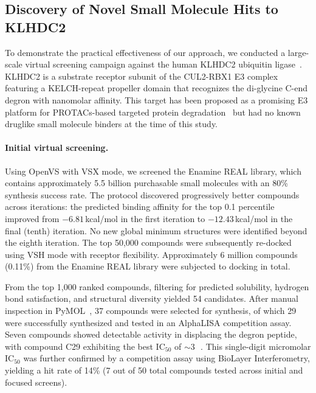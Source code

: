\documentclass[11pt]{article}
\begin{document}
\subsection{Discovery of Novel Small Molecule Hits to KLHDC2}

To demonstrate the practical effectiveness of our approach, we conducted a large-scale virtual screening campaign against the human KLHDC2 ubiquitin ligase~\citep{klhdc2_structure2019,koren2018degron}. KLHDC2 is a substrate receptor subunit of the CUL2-RBX1 E3 complex featuring a KELCH-repeat propeller domain that recognizes the di-glycine C-end degron with nanomolar affinity. This target has been proposed as a promising E3 platform for PROTACs-based targeted protein degradation~\citep{protac_klhdc2_2023,klhdc2_kinase2023} but had no known druglike small molecule binders at the time of this study.

\paragraph{Initial virtual screening.} Using OpenVS with VSX mode, we screened the Enamine REAL library, which contains approximately 5.5 billion purchasable small molecules with an 80\% synthesis success rate. The protocol discovered progressively better compounds across iterations: the predicted binding affinity for the top 0.1 percentile improved from $-6.81$\,kcal/mol in the first iteration to $-12.43$\,kcal/mol in the final (tenth) iteration. No new global minimum structures were identified beyond the eighth iteration. The top 50,000 compounds were subsequently re-docked using VSH mode with receptor flexibility. Approximately 6 million compounds (0.11\%) from the Enamine REAL library were subjected to docking in total.

From the top 1,000 ranked compounds, filtering for predicted solubility, hydrogen bond satisfaction, and structural diversity yielded 54 candidates. After manual inspection in PyMOL~\citep{pymol2015}, 37 compounds were selected for synthesis, of which 29 were successfully synthesized and tested in an AlphaLISA competition assay. Seven compounds showed detectable activity in displacing the degron peptide, with compound C29 exhibiting the best IC$_{50}$ of ${\sim}$3\,\si{\micro\molar}. This single-digit micromolar IC$_{50}$ was further confirmed by a competition assay using BioLayer Interferometry, yielding a hit rate of 14\% (7 out of 50 total compounds tested across initial and focused screens).
\end{document}
